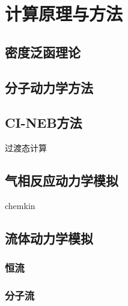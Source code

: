 \chapter{计算原理与方法}
\section{密度泛函理论}
\section{分子动力学方法} %
\section{CI-NEB方法} %
    过渡态计算
\section{气相反应动力学模拟}
chemkin
\section{流体动力学模拟}
    \subsection{恒流}
    \subsection{分子流}
